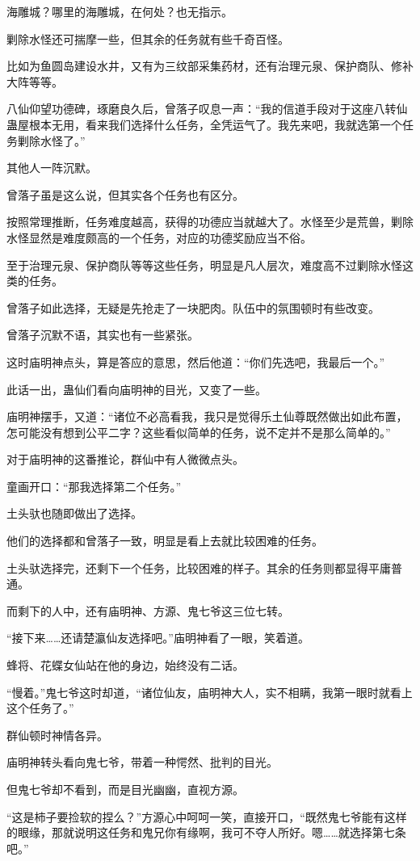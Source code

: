 \begin{this_body}
海雕城？哪里的海雕城，在何处？也无指示。

剿除水怪还可揣摩一些，但其余的任务就有些千奇百怪。

比如为鱼圆岛建设水井，又有为三纹部采集药材，还有治理元泉、保护商队、修补大阵等等。

八仙仰望功德碑，琢磨良久后，曾落子叹息一声：“我的信道手段对于这座八转仙蛊屋根本无用，看来我们选择什么任务，全凭运气了。我先来吧，我就选第一个任务剿除水怪了。”

其他人一阵沉默。

曾落子虽是这么说，但其实各个任务也有区分。

按照常理推断，任务难度越高，获得的功德应当就越大了。水怪至少是荒兽，剿除水怪显然是难度颇高的一个任务，对应的功德奖励应当不俗。

至于治理元泉、保护商队等等这些任务，明显是凡人层次，难度高不过剿除水怪这类的任务。

曾落子如此选择，无疑是先抢走了一块肥肉。队伍中的氛围顿时有些改变。

曾落子沉默不语，其实也有一些紧张。

这时庙明神点头，算是答应的意思，然后他道：“你们先选吧，我最后一个。”

此话一出，蛊仙们看向庙明神的目光，又变了一些。

庙明神摆手，又道：“诸位不必高看我，我只是觉得乐土仙尊既然做出如此布置，怎可能没有想到公平二字？这些看似简单的任务，说不定并不是那么简单的。”

对于庙明神的这番推论，群仙中有人微微点头。

童画开口：“那我选择第二个任务。”

土头驮也随即做出了选择。

他们的选择都和曾落子一致，明显是看上去就比较困难的任务。

土头驮选择完，还剩下一个任务，比较困难的样子。其余的任务则都显得平庸普通。

而剩下的人中，还有庙明神、方源、鬼七爷这三位七转。

“接下来……还请楚瀛仙友选择吧。”庙明神看了一眼，笑着道。

蜂将、花蝶女仙站在他的身边，始终没有二话。

“慢着。”鬼七爷这时却道，“诸位仙友，庙明神大人，实不相瞒，我第一眼时就看上这个任务了。”

群仙顿时神情各异。

庙明神转头看向鬼七爷，带着一种愕然、批判的目光。

但鬼七爷却不看到，而是目光幽幽，直视方源。

“这是柿子要捡软的捏么？”方源心中呵呵一笑，直接开口，“既然鬼七爷能有这样的眼缘，那就说明这任务和鬼兄你有缘啊，我可不夺人所好。嗯……就选择第七条吧。”


\end{this_body}
